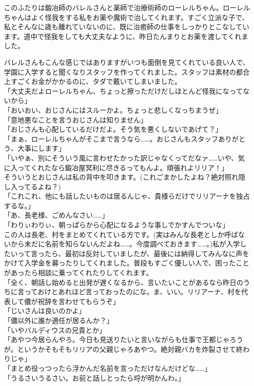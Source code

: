 \documentclass[oneside, a4paper]{jsbook}
\begin{document}
このふたりは鍛冶師のバレルさんと薬師で治療術師のローレルちゃん。ローレルちゃんはよく怪我をする私をお薬や魔術で治してくれます。すごく立派な子で、私とそんなに歳も離れていないのに、既に治癒師の仕事をしっかりとこなしています。道中で怪我をしても大丈夫なように、昨日たんまりとお薬を渡してくれました。

バレルさんもこんな感じではありますがいつも面倒を見てくれている良い人で、学園に入学すると聞くなりスタッフを作ってくれました。スタッフは素材の都合上すごくお金がかかるのに、タダで戴いてしまいました。\\

\noindent
「大丈夫だよローレルちゃん、ちょっと擦っただけだしほとんど怪我になってないから」\\
「おいおい、おじさんにはスルーかよ。ちょっと悲しくなっちまうぜ」\\
「意地悪なことを言うおじさんは知りません」\\
「おじさんも心配しているだけだよ。そう気を悪くしないであげて？」\\
「まぁ、ローレルちゃんがそこまで言うなら……。おじさんもスタッフありがとう、大事にします」\\
「いやぁ、別にそういう風に言わせたかった訳じゃなくってだなァ……いや、気に入ってくれたなら鍛冶屋冥利に尽きるってもんよ。頑張れよリリア！」\\

そういうとおじさんは私の背中を叩きます。(これごまかしたよね？絶対照れ隠し入ってるよね？)\\

\noindent
「これこれ、他にも話したいものは居るんじゃ、貴様らだけでリリアーナを独占するな。」\\
「あ、長老様、ごめんなさい……」\\
「わりぃわりぃ、朝っぱらから心配になるような事しでかすんでついな」\\

この人は長老、村をまとめてくれている方です。(実はみんな長老としか呼ばないから未だに名前を知らないんだよね……。今度調べておきます……。)私が入学したいって言ったら、最初は反対していましたが、最後には納得してみんなに声をかけて入学金を募ったりしてくれました。普段もすごく優しい人で、困ったことがあったら相談に乗ってくれたりしてくれます。\\

\noindent
「全く、朝話し始めると出発が遅くなるから、言いたいことがあるなら昨日のうちに言っておけとあれほど言っておったのにな。ま、いい。リリアーナ、村を代表して儂が祝辞を言わせてもらうぞ」\\
「じいさんは良いのかよ」\\
「儂以外に誰か適任が居るんか？」\\
「いやバルディウスの兄貴とか」\\
「あやつ今居らんやろ。今日も見送りたいと言いながらも仕事で王都じゃろうが。というかそもそもリリアの父親じゃろあやつ。絶対親バカを炸裂させて終わりじゃ」\\
「まとめ役っつったら浮かんだ名前を言っただけなんだけどな……」\\
「うるさいうるさい。お前と話しとったら埒が明かんわ。」\\
\end{document}
